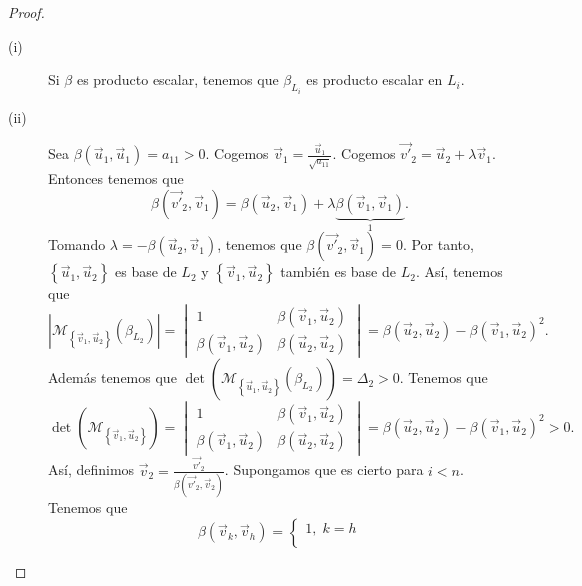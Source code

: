 \begin{proof}
\begin{description}
\item[(i)] Si $\displaystyle \beta  $ es producto escalar, tenemos que $\displaystyle \beta_{L_{i}} $ es producto escalar en $\displaystyle L_{i} $.
\item[(ii)] Sea $\displaystyle \beta\left(\vec{u}_{1},\vec{u}_{1}\right) = a_{11}>0 $. Cogemos $\displaystyle \vec{v}_{1} = \frac{\vec{u}_{1}}{\sqrt{a_{11}}} $. Cogemos $\displaystyle \vec{v'}_{2} = \vec{u}_{2}+\lambda\vec{v}_{1} $. Entonces tenemos que
	\[\beta\left(\vec{v'}_{2}, \vec{v}_{1}\right) = \beta\left(\vec{u}_{2}, \vec{v}_{1}\right)+\lambda\underbrace{\beta\left(\vec{v}_{1}, \vec{v}_{1}\right)}_{1} .\]
	Tomando $\displaystyle \lambda = -\beta\left(\vec{u}_{2}, \vec{v}_{1}\right) $, tenemos que $\displaystyle \beta\left(\vec{v'}_{2}, \vec{v}_{1}\right) = 0 $. Por tanto, $\displaystyle \left\{ \vec{u}_{1}, \vec{u}_{2}\right\}  $ es base de $\displaystyle L_{2} $ y $\displaystyle \left\{ \vec{v}_{1}, \vec{u}_{2}\right\}  $ también es base de $\displaystyle L_{2} $. Así, tenemos que 
	\[ \left|\mathcal{M}_{ \left\{ \vec{v}_{1}, \vec{u}_{2}\right\} }\left(\beta_{L_{2}}\right)\right| = \begin{vmatrix} 1 & \beta\left(\vec{v}_{1}, \vec{u}_{2}\right) \\ \beta\left(\vec{v}_{1}, \vec{u}_{2}\right) & \beta\left(\vec{u}_{2}, \vec{u}_{2}\right) \end{vmatrix} = \beta\left(\vec{u}_{2}, \vec{u}_{2}\right)-\beta\left(\vec{v}_{1}, \vec{u}_{2}\right)^{2} .\]	
	Además tenemos que $\displaystyle \det\left(\mathcal{M}_{ \left\{ \vec{u}_{1}, \vec{u}_{2}\right\} }\left(\beta_{L_{2}}\right)\right) = \Delta_{2} > 0 $. Tenemos que
	\[ \det\left(\mathcal{M}_{ \left\{ \vec{v}_{1}, \vec{u}_{2}\right\} }\right) = \begin{vmatrix} 1 & \beta\left(\vec{v}_{1}, \vec{u}_{2}\right) \\
	\beta\left(\vec{v}_{1}, \vec{u}_{2}\right) & \beta\left(\vec{u}_{2}, \vec{u}_{2}\right)\end{vmatrix} = \beta\left(\vec{u}_{2}, \vec{u}_{2}\right)-\beta\left(\vec{v}_{1}, \vec{u}_{2}\right)^{2} > 0 .\]
	Así, definimos $\displaystyle \vec{v}_{2} = \frac{\vec{v'}_{2}}{\beta\left(\vec{v'}_{2}, \vec{v}_{2}\right)} $. Supongamos que es cierto para $\displaystyle i < n $. Tenemos que 
	\[\beta\left(\vec{v}_{k}, \vec{v}_{h}\right) = 
	\begin{cases}
	1, \; k = h\\

\end{cases}\]
\end{description}
\end{proof}
